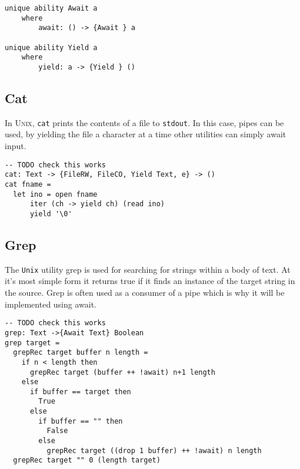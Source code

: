 \documentclass[logo,bsc,singlespacing,parskip]{infthesis}
\begin{document}
\begin{lstlisting}[language=unison]
unique ability Await a
    where
        await: () -> {Await } a

unique ability Yield a
    where
        yield: a -> {Yield } ()
\end{lstlisting}

\subsection{Cat}
In \textsc{Unix}, \texttt{cat} prints the contents of a file to
\texttt{stdout}. In this case, pipes can be used, by yielding the file a
character at a time other utilities can simply await input.  

\begin{lstlisting}[language=unison]
-- TODO check this works 
cat: Text -> {FileRW, FileCO, Yield Text, e} -> ()
cat fname = 
  let ino = open fname
      iter (ch -> yield ch) (read ino)
      yield '\0'

\end{lstlisting}

\subsection{Grep}

The \texttt{Unix} utility grep is used for searching for strings within a body
of text. At it's most simple  form it returns true if it finds an instance of
the target string in the source. Grep is often used as a consumer of a pipe
which is why it will be implemented using await.

\begin{lstlisting}[language=unison]
-- TODO check this works
grep: Text ->{Await Text} Boolean 
grep target = 
  grepRec target buffer n length =
    if n < length then
      grepRec target (buffer ++ !await) n+1 length
    else 
      if buffer == target then
        True
      else 
        if buffer == "" then
          False
        else 
          grepRec target ((drop 1 buffer) ++ !await) n length
  grepRec target "" 0 (length target)

\end{lstlisting}
\end{document}
